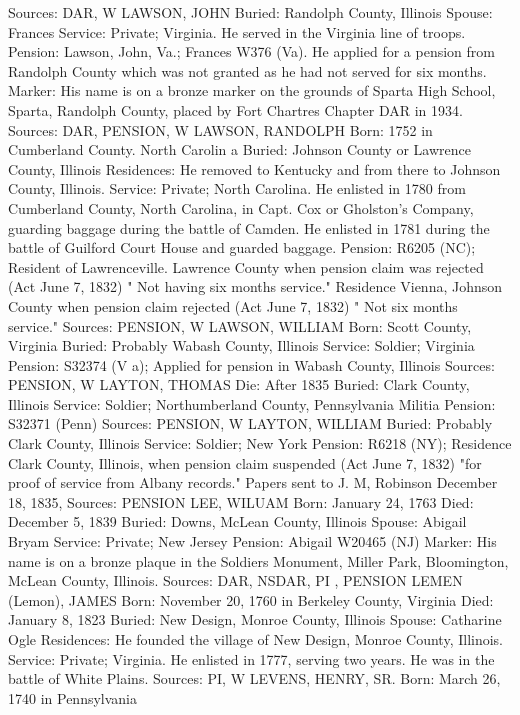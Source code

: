 Sources: DAR, W 
LAWSON, JOHN
Buried: Randolph County, Illinois
Spouse: Frances
Service: Private; Virginia. He served in the Virginia line of troops.
Pension: Lawson, John, Va.; Frances W376 (Va). He applied for a pension from Randolph County which was not granted as he had not served for six months.
Marker: His name is on a bronze marker on the grounds of Sparta High School, Sparta, Randolph County, placed by Fort Chartres Chapter DAR in 1934.
Sources: DAR, PENSION, W 
LAWSON, RANDOLPH
Born: 1752 in Cumberland County. North Carolin a
Buried: Johnson County or Lawrence County, Illinois Residences: He removed to Kentucky and from there to Johnson County, Illinois. 
Service: Private; North Carolina. He enlisted in 1780 from Cumberland County, North Carolina, in Capt. Cox or Gholston's Company, guarding baggage during the battle of Camden. He enlisted in 1781 during the battle of Guil­ford Court House and guarded baggage. 
Pension: R6205 (NC); Resident of Lawrenceville. Lawrence County when pension claim was rejected (Act June 7, 1832) " Not having six months service." Residence Vienna, Johnson County when pension claim rejected (Act June 7, 1832) " Not six months service." 
Sources: PENSION, W 
LAWSON, WILLIAM
Born: Scott County, Virginia
Buried: Probably Wabash County, Illinois
Service: Soldier; Virginia
Pension: S32374 (V a); Applied for pension in Wabash County, Illinois
Sources: PENSION, W 
LAYTON, THOMAS 
Die: After 1835
Buried: Clark County, Illinois
Service: Soldier; Northumberland County, Pennsylvania Militia
Pension: S32371 (Penn)
Sources: PENSION, W 
LAYTON, WILLIAM
Buried: Probably Clark County, Illinois
Service: Soldier; New York
Pension: R6218 (NY); Residence Clark County, Illinois, when pension claim suspended (Act June 7, 1832) "for proof of service from Albany records." Papers sent to J. M, Robinson December 18, 1835,
Sources: PENSION 
LEE, WILUAM
Born: January 24, 1763
Died: December 5, 1839
Buried: Downs, McLean County, Illinois 
Spouse: Abigail Bryam
Service: Private; New Jersey
Pension: Abigail W20465 (NJ)
Marker: His name is on a bronze plaque in the Soldiers Monument, Miller Park, Bloomington, McLean County, Illinois.
Sources: DAR, NSDAR, PI , PENSION 
LEMEN (Lemon), JAMES
Born: November 20, 1760 in Berkeley County, Virginia
Died: January 8, 1823
Buried: New Design, Monroe County, Illinois
Spouse: Catharine Ogle Residences: He founded the village of New Design, Monroe County, Illinois.
Service: Private; Virginia. He enlisted in 1777, serving two years. He was in the battle of White Plains.
Sources: PI, W 
LEVENS, HENRY, SR. 
Born: March 26, 1740 in Pennsylvania 
